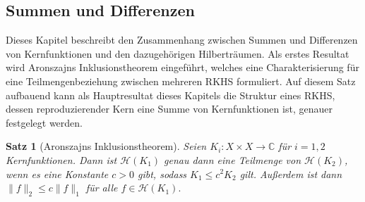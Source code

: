 \documentclass[12pt,titlepage,twoside,cleardoublepage]{article}
\theoremstyle{nummermitklammern}
\newtheorem{satz}[temp]{Satz}
\newtheorem{satz}[zahl]{Satz}
\numberwithin{equation}{section}
\begin{document}
\subsection{Summen und Differenzen}
Dieses Kapitel beschreibt den Zusammenhang zwischen Summen und Differenzen von Kernfunktionen und den dazugehörigen Hilberträumen. Als erstes Resultat wird  Aronszajns Inklusionstheorem eingeführt, welches eine Charakterisierung für eine Teilmengenbeziehung zwischen mehreren RKHS formuliert. Auf diesem Satz aufbauend kann als Hauptresultat dieses Kapitels die Struktur eines RKHS, dessen reproduzierender Kern eine Summe von Kernfunktionen ist, genauer festgelegt werden.
\begin{satz}[Aronszajns Inklusionstheorem]\label{51}
Seien $K_i:X\times X\to \mathbb{C}$ für $i=1,2$ Kernfunktionen. Dann ist $\mathcal{H}(K_1)$ genau dann eine Teilmenge von $\mathcal{H}(K_2)$, wenn  es eine Konstante $c>0 $ gibt, sodass $K_1 \leq c^2 K_2$ gilt. 
Außerdem ist dann $\|f \|_2 \leq c\|f\|_1$ für alle $f \in \mathcal{H}(K_1).$ 
\end{satz}
\end{document}
